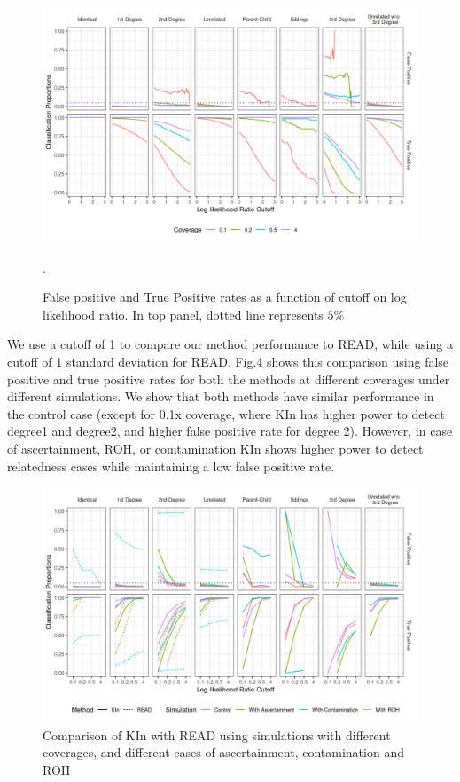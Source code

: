 \documentclass[12pt, letterpaper]{article}
\begin{document}
\begin{figure}[h]
    \centering
    \includegraphics[width=18cm]{plots/plotimg/contam0_inbred0_model_performance_allroc_asc0_plot.png}
    \caption{False positive and True Positive rates as a function of cutoff on log likelihood ratio. In top panel, dotted line represents $5\%$}.
    \label{fig3}
\end{figure}

We use a cutoff of 1 to compare our method performance to READ, while using a cutoff of 1 standard deviation for READ. Fig.4 shows this comparison using false positive and true positive rates for both the methods at different coverages under different simulations. We show that both methods have similar performance in the control case (except for 0.1x coverage, where KIn has higher power to detect degree1 and degree2, and higher false positive rate for degree 2). However, in case of ascertainment, ROH, or comtamination KIn shows higher power to detect relatedness cases while maintaining a low false positive rate. 

\begin{figure}[h]
    \centering
    \includegraphics[width=18cm]{plots/plotimg/comparison_plot.png}
    \caption{Comparison of KIn with READ using simulations with different coverages, and different cases of ascertainment, contamination and ROH}
    \label{fig4}
\end{figure}
\end{document}
